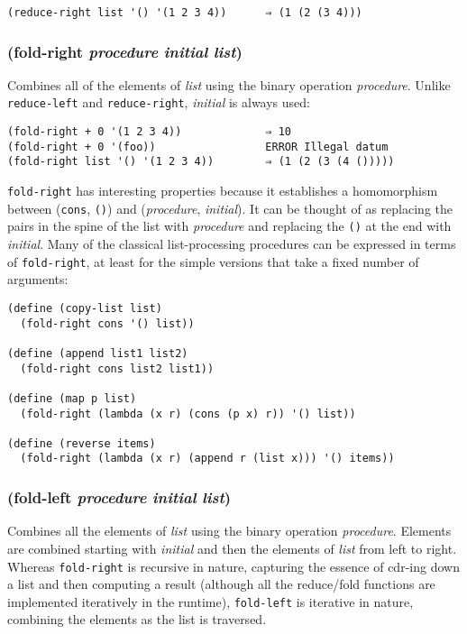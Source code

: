 \documentclass{article}
\begin{document}
\begin{verbatim}
(reduce-right list '() '(1 2 3 4))      ⇒ (1 (2 (3 4)))
\end{verbatim}

\subsubsection{(fold-right \emph{procedure} \emph{initial} \emph{list})}

Combines all of the elements of \emph{list} using the binary operation \emph{procedure}.
Unlike \verb|reduce-left| and \verb|reduce-right|, \emph{initial} is always used:

\begin{verbatim}
(fold-right + 0 '(1 2 3 4))             ⇒ 10
(fold-right + 0 '(foo))                 ERROR Illegal datum
(fold-right list '() '(1 2 3 4))        ⇒ (1 (2 (3 (4 ()))))
\end{verbatim}

\verb|fold-right| has interesting properties because it establishes a homomorphism between
(\verb|cons|, \verb|()|) and (\emph{procedure}, \emph{initial}). It can be thought of as
replacing the pairs in the spine of the list with \emph{procedure} and replacing the
\verb|()| at the end with \emph{initial}. Many of the classical list-processing procedures
can be expressed in terms of \verb|fold-right|, at least for the simple versions that take a
fixed number of arguments:

\begin{verbatim}
(define (copy-list list)
  (fold-right cons '() list))

(define (append list1 list2)
  (fold-right cons list2 list1))

(define (map p list)
  (fold-right (lambda (x r) (cons (p x) r)) '() list))

(define (reverse items)
  (fold-right (lambda (x r) (append r (list x))) '() items))
\end{verbatim}

\subsubsection{(fold-left \emph{procedure} \emph{initial} \emph{list})}

Combines all the elements of \emph{list} using the binary operation \emph{procedure}. Elements
are combined starting with \emph{initial} and then the elements of \emph{list} from left to
right. Whereas \verb|fold-right| is recursive in nature, capturing the essence of cdr-ing
down a list and then computing a result (although all the reduce/fold functions are
implemented iteratively in the runtime), \verb|fold-left| is iterative in nature, combining
the elements as the list is traversed.
\end{document}
